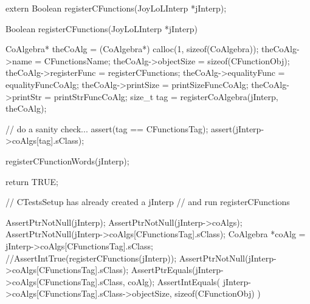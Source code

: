 \startTestSuite[registerCFunctions]

\startCHeader
extern Boolean registerCFunctions(JoyLoLInterp *jInterp);
\stopCHeader
{}

\startCCode
Boolean registerCFunctions(JoyLoLInterp *jInterp) {
  CoAlgebra* theCoAlg    = (CoAlgebra*) calloc(1, sizeof(CoAlgebra));
  theCoAlg->name         = CFunctionsName;
  theCoAlg->objectSize   = sizeof(CFunctionObj);
  theCoAlg->registerFunc = registerCFunctions;
  theCoAlg->equalityFunc = equalityFuncCoAlg;
  theCoAlg->printSize    = printSizeFuncCoAlg;
  theCoAlg->printStr     = printStrFuncCoAlg;
  size_t tag = registerCoAlgebra(jInterp, theCoAlg);

  // do a sanity check...
  assert(tag == CFunctionsTag);
  assert(jInterp->coAlgs[tag].sClass);
  
  registerCFunctionWords(jInterp);
  
  return TRUE;
}
\stopCCode


\startCTest
  // CTestsSetup has already created a jInterp
  // and run registerCFunctions
  
  AssertPtrNotNull(jInterp);
  AssertPtrNotNull(jInterp->coAlgs);
  AssertPtrNotNull(jInterp->coAlgs[CFunctionsTag].sClass);
  CoAlgebra *coAlg = jInterp->coAlgs[CFunctionsTag].sClass;
  //AssertIntTrue(registerCFunctions(jInterp));
  AssertPtrNotNull(jInterp->coAlgs[CFunctionsTag].sClass);
  AssertPtrEquals(jInterp->coAlgs[CFunctionsTag].sClass, coAlg);
  AssertIntEquals(
    jInterp->coAlgs[CFunctionsTag].sClass->objectSize,
    sizeof(CFunctionObj)
  )
\stopCTest
\stopTestCase
\stopTestSuite